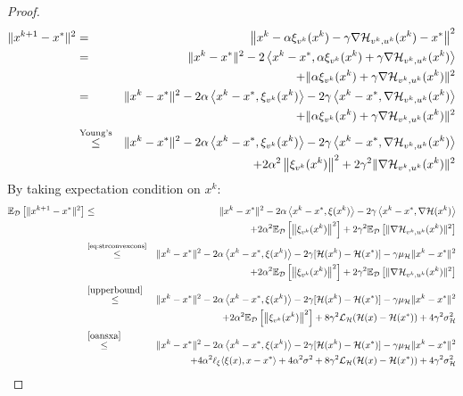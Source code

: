\documentclass{article}
\begin{document}
\begin{proof}
\begin{eqnarray}
\label{nannjdalsnaalsna}
\|x^{k+1}-x^*\|^2 &=&\left\|x^k-\alpha \xi_{v^k}(x^k)-\gamma \nabla {\cal H}_{v^k,u^k}(x^k)-x^* \right\|^2\notag\\
&=&\|x^k-x^*\|^2-2 \left\langle x^k-x^*, \alpha \xi_{v^k}(x^k) +\gamma \nabla {\cal H}_{v^k,u^k}(x^k) \right\rangle \notag\\ && + \| \alpha \xi_{v^k}(x^k) +\gamma \nabla {\cal H}_{v^k,u^k}(x^k)\|^2\notag\\
&=&\|x^k-x^*\|^2-2 \alpha \left\langle x^k-x^*, \xi_{v^k}(x^k)\right\rangle -2 \gamma \left\langle x^k-x^*,\nabla {\cal H}_{v^k,u^k}(x^k) \right\rangle \notag\\ && + \| \alpha \xi_{v^k}(x^k)+\gamma \nabla {\cal H}_{v^k,u^k}(x^k)\|^2\notag\\
&\overset{\text{Young's}}{\leq}&\|x^k-x^*\|^2-2 \alpha \left\langle x^k-x^*, \xi_{v^k}(x^k)\right\rangle -2 \gamma \left\langle x^k-x^*,\nabla {\cal H}_{v^k,u^k}(x^k) \right\rangle \notag\\ && + 2\alpha^2 \left\|\xi_{v^k}(x^k) \right\|^2 +2 \gamma^2 \| \nabla {\cal H}_{v^k,u^k}(x^k)\|^2
\end{eqnarray}
By taking expectation condition on $x^k$:
\begin{eqnarray}
\label{ncaslaoaxnalskn}
\mathbb{E}_{{\cal D}} \left[ \|x^{k+1}-x^*\|^2 \right]&\leq& \|x^k-x^*\|^2-2 \alpha \left\langle x^k-x^*, \xi(x^k)\right\rangle -2 \gamma \left\langle x^k-x^*,\nabla {\cal H}(x^k) \right\rangle \notag\\ && + 2\alpha^2  \mathbb{E}_{{\cal D}}  \left[ \left\|\xi_{v^k}(x^k) \right\|^2 \right] +2 \gamma^2 \mathbb{E}_{{\cal D}}   \left[ \|  \nabla {\cal H}_{v^k,u^k}(x^k)\|^2 \right]\notag\\
&\overset{\text{\eqref{eq:strconvexcons}}}{\leq}& \|x^k-x^*\|^2-2 \alpha \left\langle x^k-x^*, \xi(x^k)\right\rangle -2 \gamma[{\cal H}(x^k)-{\cal H}(x^*)]- \gamma \mu_{{\cal H}} \|x^k-x^*\|^2 \notag\\ && + 2\alpha^2  \mathbb{E}_{{\cal D}}  \left[ \left\|\xi_{v^k}(x^k) \right\|^2 \right] +2 \gamma^2 \mathbb{E}_{{\cal D}}   \left[ \|  \nabla {\cal H}_{v^k,u^k}(x^k)\|^2 \right]\notag\\
&\overset{\eqref{upperbound}}{\leq}& \|x^k-x^*\|^2-2 \alpha \left\langle x^k-x^*, \xi(x^k)\right\rangle -2 \gamma [{\cal H}(x^k)-{\cal H}(x^*)]- \gamma \mu_{{\cal H}} \|x^k-x^*\|^2 \notag\\ && + 2\alpha^2  \mathbb{E}_{{\cal D}}  \left[ \left\|\xi_{v^k}(x^k) \right\|^2 \right]  + 8 \gamma^2 {\cal L}_{{\cal H}} ( {\cal H}(x)-{\cal H}(x^*) ) + 4 \gamma^2  \sigma_{{\cal H}}^2 \notag\\
&\overset{\eqref{oansxa}}{\leq}& \|x^k-x^*\|^2-2 \alpha \left\langle x^k-x^*, \xi(x^k)\right\rangle -2 \gamma[{\cal H}(x^k)-{\cal H}(x^*)]- \gamma\mu_{{\cal H}} \|x^k-x^*\|^2 \notag\\ && + 4\alpha^2 \ell_{\xi}\langle\xi(x),x-x^*\rangle + 4\alpha^2 \sigma^2 + 8 \gamma^2 {\cal L}_{{\cal H}} ( {\cal H}(x)-{\cal H}(x^*) ) + 4 \gamma^2  \sigma_{{\cal H}}^2 
\end{eqnarray}


\end{proof}
\end{document}
